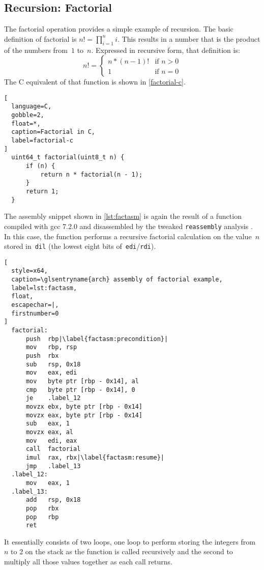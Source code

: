 \subsection{Recursion: Factorial}\label{sse:factorial_example}
The factorial operation provides a simple example of recursion.%
%
The basic definition of factorial is $n!=\prod_{i=1}^n i$.%
This results in a number that is the product of the numbers from~$1$ to~$n$.
Expressed in recursive form, that definition is:
\begin{equation}
  n!=\begin{cases}
    n * (n - 1)! & \text{if }n > 0 \\
    1 & \text{if }n = 0
  \end{cases}
\end{equation}
The C equivalent of that function is shown in \cref{factorial-c}.
\begin{lstlisting}[
  language=C,
  gobble=2,
  float=*,
  caption=Factorial in C,
  label=factorial-c
]
  uint64_t factorial(uint8_t n) {
      if (n) {
          return n * factorial(n - 1);
      }
      return 1;
  }
\end{lstlisting}
The assembly snippet shown in \cref{lst:factasm} is again
the result of a function compiled with \ac{gcc} 7.2.0
and disassembled by the tweaked \lstinline|reassembly| analysis \autocite{wang2017ramblr}.
In this case, the function performs a recursive factorial calculation on the value~$n$
stored in~\lstinline|dil| (the lowest eight bits of~\lstinline|edi|/\lstinline|rdi|).
\begin{lstlisting}[
  style=x64,
  caption=\glsentryname{arch} assembly of factorial example,
  label=lst:factasm,
  float,
  escapechar=|,
  firstnumber=0
]
  factorial:
      push  rbp|\label{factasm:precondition}|
      mov   rbp, rsp
      push  rbx
      sub   rsp, 0x18
      mov   eax, edi
      mov   byte ptr [rbp - 0x14], al
      cmp   byte ptr [rbp - 0x14], 0
      je    .label_12
      movzx ebx, byte ptr [rbp - 0x14]
      movzx eax, byte ptr [rbp - 0x14]
      sub   eax, 1
      movzx eax, al
      mov   edi, eax
      call  factorial
      imul  rax, rbx|\label{factasm:resume}|
      jmp   .label_13
  .label_12:
      mov   eax, 1
  .label_13:
      add   rsp, 0x18
      pop   rbx
      pop   rbp
      ret
\end{lstlisting}
It essentially consists of two loops,
one loop to perform storing the integers from~$n$ to 2 on the stack as the function
is called recursively
and the second to multiply all those values together as each call returns.

